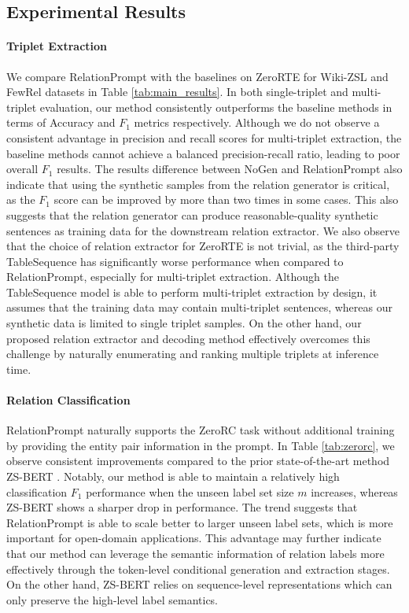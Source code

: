 \documentclass[11pt]{article}
\begin{document}
 
\subsection{Experimental Results}

\paragraph{Triplet Extraction}
We compare RelationPrompt with the baselines on ZeroRTE for Wiki-ZSL and FewRel datasets in Table \ref{tab:main_results}.
In both single-triplet and multi-triplet evaluation, our method consistently outperforms the baseline methods in terms of Accuracy and $F_{1}$ metrics respectively.
Although we do not observe a consistent advantage in precision and recall scores for multi-triplet extraction, the baseline methods cannot achieve a balanced precision-recall ratio, leading to poor overall $F_{1}$ results.
The results difference between NoGen and RelationPrompt also indicate that using the synthetic samples from the relation generator is critical, as the $F_{1}$ score can be improved by more than two times in some cases.
This also suggests that the relation generator can produce reasonable-quality synthetic sentences as training data for the downstream relation extractor.
We also observe that the choice of relation extractor for ZeroRTE is not trivial, as the third-party TableSequence \cite{wang2020two} has significantly worse performance when compared to RelationPrompt, especially for multi-triplet extraction.
Although the TableSequence model is able to perform multi-triplet extraction by design, it assumes that the training data may contain multi-triplet sentences, whereas our synthetic data is limited to single triplet samples.
On the other hand, our proposed relation extractor and decoding method effectively overcomes this challenge by naturally enumerating and ranking multiple triplets at inference time. 


\paragraph{Relation Classification} 
RelationPrompt naturally supports
the ZeroRC task without additional training by providing the entity pair information in the prompt.
In Table \ref{tab:zerorc}, we observe consistent improvements compared to the prior state-of-the-art method ZS-BERT \cite{chen2021zs}.
Notably, our method is able to maintain a relatively high classification $F_{1}$ performance when the unseen label set size $m$ increases, whereas ZS-BERT shows a sharper drop in performance.
The trend suggests that RelationPrompt is able to scale better to larger unseen label sets, which is more important for open-domain applications.
This advantage may further indicate that our method can leverage the semantic information of relation labels more effectively through the token-level conditional generation and extraction stages. 
On the other hand, ZS-BERT relies on sequence-level representations which can only preserve the high-level label semantics.
\end{document}
